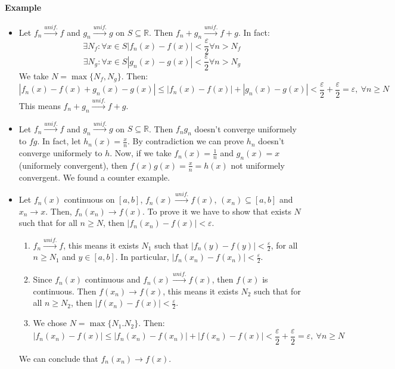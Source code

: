 \documentclass{article}
\newcommand{\abs}[1]{\left|#1\right|}
\newcommand{\tounif}{\xrightarrow{unif.}}
\newcommand{\intcc}[1]{\left[#1\right]}
\newcommand{\R}{\mathbb{R}}
\newcommand{\Ep}{\varepsilon}
\newcommand{\Example}{\paragraph{Example}}
\begin{document}
  \Example
\begin{itemize}
  \item %
  Let $f_n \tounif f$ and $g_n \tounif g$ on $S \subseteq \R$. Then $f_n + g_n
  \tounif f + g$. In fact:
\begin{equation*}
  \exists N_f : \forall x \in S \abs{f_n(x) - f(x)} < \frac{\Ep}{2} \forall n > N_f
\end{equation*}
\begin{equation*}
  \exists N_g : \forall x \in S \abs{g_n(x) - g(x)} < \frac{\Ep}{2} \forall n > N_g
\end{equation*}
  We take $N = \max \{ N_f, N_g \}$. Then:
\begin{equation*}
  \abs{f_n(x) - f(x) + g_n(x) - g(x)} \leq \abs{f_n(x) - f(x)} + \abs{g_n(x) -
  g(x)} < \frac{\Ep}{2} + \frac{\Ep}{2} = \Ep, \ \forall n \geq N
\end{equation*}
  This means $f_n + g_n \tounif f + g$.

  \item %
  Let $f_n \tounif f$ and $g_n \tounif g$ on $S \subseteq \R$. Then $f_n g_n$
  doesn't converge uniformely to $fg$. In fact, let $h_n(x) = \frac{x}{n}$.
  By contradiction we can prove $h_n$ doesn't converge uniformely to $h$. Now,
  if we take $f_n(x) = \frac{1}{n}$ and $g_n(x) = x$ (uniformely convergent),
  then $f(x) g(x) = \frac{x}{n} = h(x)$ not uniformely convergent. We found a
  counter example.

  \item %
  Let $f_n(x)$ continuous on $\intcc{a,b}$, $f_n(x) \tounif f(x)$, $(x_n)
  \subseteq \intcc{a,b}$ and $x_n \to x$. Then, $f_n(x_n) \to f(x)$. To prove it
  we have to show that exists $N$ such that for all $n \geq N$, then
  $\abs{f_n(x_n) - f(x)} < \Ep$.
  \begin{enumerate}
    \item $f_n \tounif f$, this means it exists $N_1$ such that $\abs{f_n(y) -
    f(y)} < \frac{\Ep}{2}$, for all $n \geq N_1$ and $y \in \intcc{a,b}$. In
    particular, $\abs{f_n(x_n) - f(x_n)} < \frac{\Ep}{2}$.

    \item Since $f_n(x)$ continuous and $f_n(x) \tounif f(x)$, then $f(x)$ is
    continuous. Then $f(x_n) \to f(x)$, this means it exists $N_2$ such that
    for all $n \geq N_2$, then $\abs{f(x_n) - f(x)} < \frac{\Ep}{2}$.

    \item We chose $N = \max \{ N_1. N_2 \}$. Then:
    \begin{equation*}
      \abs{f_n(x_n) - f(x)} \leq \abs{f_n(x_n) - f(x_n)} + \abs{f(x_n) - f(x)} <
      \frac{\Ep}{2} + \frac{\Ep}{2} = \Ep, \ \forall n \geq N
    \end{equation*}
  \end{enumerate}
  We can conclude that $f_n(x_n) \to f(x)$.
\end{itemize}
\end{document}
